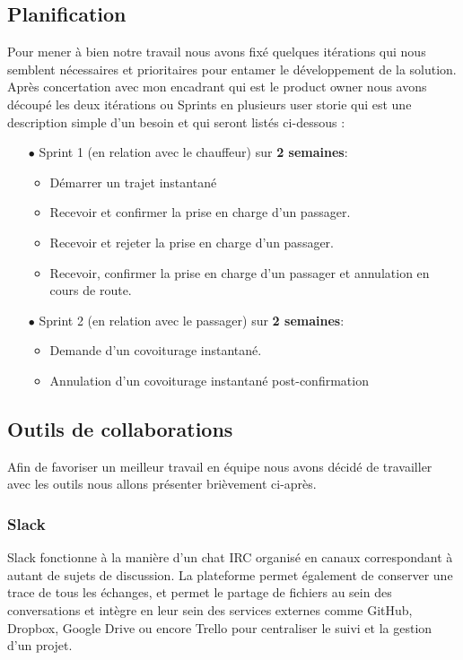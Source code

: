 \subsection{Planification} %
\label{sub:planification}
Pour mener à bien notre travail nous avons fixé quelques itérations qui nous semblent nécessaires et prioritaires pour entamer le développement de la solution. Après concertation avec mon encadrant qui est le product owner nous avons découpé les deux itérations ou Sprints en plusieurs user storie qui est une description simple d’un besoin et qui seront listés ci-dessous :
\begin{itemize}
	\item[$\bullet$] Sprint 1 (en relation avec le chauffeur) sur \textbf{2 semaines}:
		\begin{itemize}
			\item Démarrer un trajet instantané
			\item Recevoir et confirmer la prise en charge d’un passager.
			\item Recevoir et rejeter la prise en charge d’un passager.
			\item Recevoir, confirmer la prise en charge d’un passager et annulation en cours de route.
		\end{itemize}
	\item[$\bullet$] Sprint 2 (en relation avec le passager) sur \textbf{2 semaines}:
		\begin{itemize}
			\item Demande d’un covoiturage instantané.
			\item Annulation d’un covoiturage instantané post-confirmation
	\end{itemize}
\end{itemize}

\subsection{Outils de collaborations} %
\label{sub:outils_de_collaborations}

Afin de favoriser un meilleur travail en équipe nous avons décidé de travailler avec les outils nous allons présenter brièvement ci-après.
\subsubsection{Slack} %
\label{ssub:subsubsection_name}

Slack fonctionne à la manière d'un chat IRC organisé en canaux correspondant à autant de sujets de discussion. La plateforme permet également de conserver une trace de tous les échanges, et permet le partage de fichiers au sein des conversations et intègre en leur sein des services externes comme GitHub, Dropbox, Google Drive ou encore Trello pour centraliser le suivi et la gestion d'un projet. 

